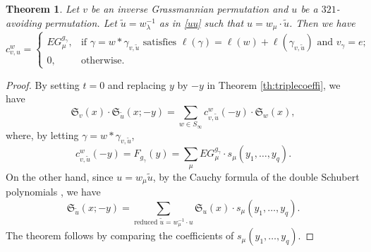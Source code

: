 \documentclass[12pt,reqno]{amsart}
\numberwithin{equation}{section}
\newtheorem{theorem}{Theorem}[section]
\theoremstyle{definition}
\begin{document}
\begin{theorem}\label{thm:egcoeff}
Let $v$ be an inverse Grassmannian permutation and $u$ be a $321$-avoiding permutation. Let $\tilde{u}=w^{-1}_{\lambda}$ as in \eqref{uu} such that $u=w_{\mu}\cdot\tilde{u}$. Then we have 
$$c_{v,u}^w=\begin{cases}
EG^{g_{\gamma}}_{\mu}, & 
\text{if $\gamma=w*\gamma_{v,\tilde{u}}$ 
satisfies $\ell(\gamma)=\ell(w)+\ell(\gamma_{v,\tilde{u}})$ and 
$v_\gamma=e$}; \\[1ex]
0,& \text{otherwise}.  
\end{cases}$$
\end{theorem}
\begin{proof}
By setting $t=0$ and replacing $y$ by $-y$ in Theorem \ref{th:triplecoeffi}, we have 
$$\mathfrak{S}_v(x)\cdot
\mathfrak{S}_{\tilde{u}}(x;-y)=
\sum_{w\in S_\infty} c_{v,\tilde{u}}^w(-y)\cdot \mathfrak{S}_w(x),$$
where, by letting $\gamma=w*\gamma_{v,\tilde{u}}$,
$$c_{v,\tilde{u}}^w(-y)
=F_{g_{\gamma}}(y)
=\sum_{\mu}EG^{g_{\gamma}}_{\mu}\cdot
s_{\mu}(y_1,\ldots,y_q).$$
On the other hand, since $u=w_{\mu}\tilde{u}$, by the Cauchy formula of the double Schubert polynomials  \cite{MacDonald}, we have
$$\mathfrak{S}_{\tilde{u}}(x;-y)=\sum_{\text{reduced }\tilde{u}=w^{-1}_\mu\cdot u}
\mathfrak{S}_{u}(x)\cdot
s_{\mu}(y_1,\ldots,y_q).$$
The theorem follows by comparing the coefficients of $s_\mu(y_1,\ldots,y_q)$.
\end{proof}
\end{document}
